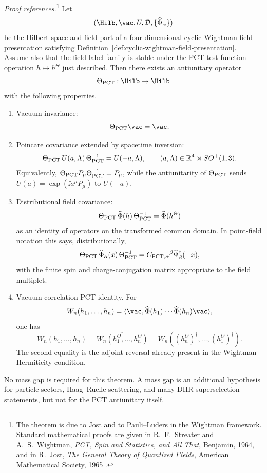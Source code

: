 \begin{theorem}
\label{thm:wightman-pct}
\emph{Proof references.}\footnote{The theorem is due to Jost and to
Pauli--Luders in the Wightman framework.  Standard mathematical proofs are
given in R.~F.~Streater and A.~S.~Wightman, \emph{PCT, Spin and Statistics,
and All That}, Benjamin, 1964, and in R.~Jost, \emph{The General Theory of
Quantized Fields}, American Mathematical Society, 1965
\cite{StreaterWightman1964,Jost1965}.}
Let
\[
  (\Hilb,\vac,U,\mathcal D,\{\widehat\Phi_\alpha\})
\]
be the Hilbert-space and field part of a four-dimensional cyclic Wightman
field presentation satisfying
Definition~\ref{def:cyclic-wightman-field-presentation}.  Assume also that
the field-label family is stable under the PCT test-function operation
\(h\mapsto h^\Theta\) just described.  Then there exists an antiunitary
operator
\[
  \Theta_{\rm PCT}:\Hilb\to\Hilb
\]
with the following properties.
\begin{enumerate}[label=\textup{(\roman*)}]
\item Vacuum invariance:
\[
  \Theta_{\rm PCT}\vac=\vac .
\]
\item Poincare covariance extended by spacetime inversion:
\begin{equation}
  \Theta_{\rm PCT}\,U(a,\Lambda)\,\Theta_{\rm PCT}^{-1}
  =
  U(-a,\Lambda),
  \qquad
  (a,\Lambda)\in \mathbb R^4\rtimes SO^+(1,3).
  \label{eq:pct-poincare-implementation}
\end{equation}
Equivalently, \(\Theta_{\rm PCT}P_\mu\Theta_{\rm PCT}^{-1}=P_\mu\), while the
antiunitarity of \(\Theta_{\rm PCT}\) sends \(U(a)=\exp(\ii a^\mu P_\mu)\) to
\(U(-a)\).
\item Distributional field covariance:
\begin{equation}
  \Theta_{\rm PCT}\,\widehat\Phi(h)\,\Theta_{\rm PCT}^{-1}
  =
  \widehat\Phi(h^\Theta)
  \label{eq:pct-field-covariance}
\end{equation}
as an identity of operators on the transformed common domain.  In point-field
notation this says, distributionally,
\[
  \Theta_{\rm PCT}\,\widehat\Phi_\alpha(x)\,\Theta_{\rm PCT}^{-1}
  =
  C_{\rm PCT,\alpha}{}^\beta
  \widehat\Phi_\beta^\dagger(-x),
\]
with the finite spin and charge-conjugation matrix appropriate to the field
multiplet.
\item Vacuum correlation PCT identity.  For
\[
  W_n(h_1,\ldots,h_n)
  =
  \langle\vac,\widehat\Phi(h_1)\cdots\widehat\Phi(h_n)\vac\rangle,
\]
one has
\begin{equation}
  W_n(h_1,\ldots,h_n)
  =
  \overline{W_n(h_1^\Theta,\ldots,h_n^\Theta)}
  =
  W_n((h_n^\Theta)^\dagger,\ldots,(h_1^\Theta)^\dagger).
  \label{eq:pct-wightman-identity}
\end{equation}
The second equality is the adjoint reversal already present in the Wightman
Hermiticity condition.
\end{enumerate}
No mass gap is required for this theorem.  A mass gap is an additional
hypothesis for particle sectors, Haag--Ruelle scattering, and many DHR
superselection statements, but not for the PCT antiunitary itself.
\end{theorem}

